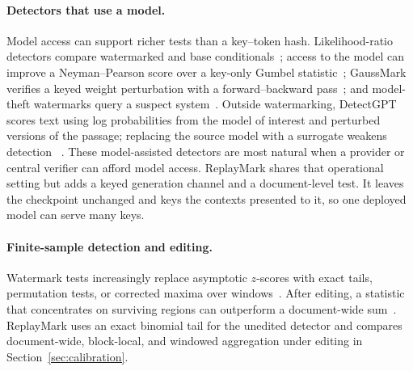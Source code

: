 \paragraph{Detectors that use a model.}
Model access can support richer tests than a key--token hash. Likelihood-ratio detectors compare
watermarked and base conditionals~\citep{hu2024unbiased}; access to the model can improve a
Neyman--Pearson score over a key-only Gumbel statistic~\citep{fernandez2023bricks}; GaussMark
verifies a keyed weight perturbation with a forward--backward pass~\citep{block2025gaussmark};
and model-theft watermarks query a suspect system~\citep{zhao2023invisible}. Outside watermarking,
DetectGPT scores text using log probabilities from the model of interest and perturbed versions of
the passage; replacing the source model with a surrogate weakens detection
~\citep{mitchell2023detectgpt}. These model-assisted detectors are most natural when a provider or
central verifier can afford model access. ReplayMark shares that operational setting but adds a
keyed generation channel and a document-level test. It leaves the checkpoint unchanged and keys
the contexts presented to it, so one deployed model can serve many keys.

\paragraph{Finite-sample detection and editing.}
Watermark tests increasingly replace asymptotic $z$-scores with exact tails, permutation tests,
or corrected maxima over windows~\citep{fernandez2023bricks,kuditipudi2024distortionfree,
kirchenbauer2024reliability}. After editing, a statistic that concentrates on surviving regions
can outperform a document-wide sum~\citep{li2025editrobust}. ReplayMark uses an exact binomial
tail for the unedited detector and compares document-wide, block-local, and windowed aggregation
under editing in Section~\ref{sec:calibration}.
